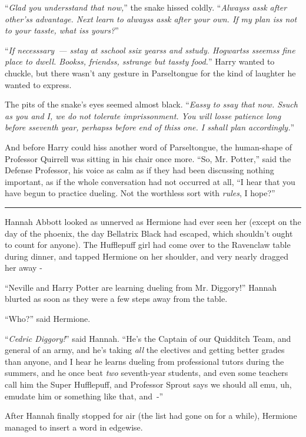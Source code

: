 ``\emph{Glad you undersstand that now,}'' the snake hissed coldly. ``\emph{Alwayss assk after other'ss advantage. Next learn to alwayss assk after your own. If my plan iss not to your tasste, what iss yours?}''

``\emph{If necesssary~--- sstay at sschool ssix yearss and sstudy. Hogwartss sseemss fine place to dwell. Bookss, friendss, sstrange but tassty food.}'' Harry wanted to chuckle, but there wasn't any gesture in Parseltongue for the kind of laughter he wanted to express.

The pits of the snake's eyes seemed almost black. ``\emph{Eassy to ssay that now. Ssuch as you and I, we do not tolerate imprissonment. You will losse patience long before sseventh year, perhapss before end of thiss one. I sshall plan accordingly.}''

And before Harry could hiss another word of Parseltongue, the human-shape of Professor Quirrell was sitting in his chair once more. ``So, Mr. Potter,'' said the Defense Professor, his voice as calm as if they had been discussing nothing important, as if the whole conversation had not occurred at all, ``I hear that you have begun to practice dueling. Not the worthless sort with \emph{rules}, I hope?''

\begin{center}\rule{3in}{0.4pt}\end{center}

Hannah Abbott looked as unnerved as Hermione had ever seen her (except on the day of the phoenix, the day Bellatrix Black had escaped, which shouldn't ought to count for anyone). The Hufflepuff girl had come over to the Ravenclaw table during dinner, and tapped Hermione on her shoulder, and very nearly dragged her away -

``Neville and Harry Potter are learning dueling from Mr. Diggory!'' Hannah blurted as soon as they were a few steps away from the table.

``Who?'' said Hermione.

``\emph{Cedric Diggory!}'' said Hannah. ``He's the Captain of our Quidditch Team, and general of an army, and he's taking \emph{all} the electives and getting better grades than anyone, and I hear he learns dueling from professional tutors during the summers, and he once beat \emph{two} seventh-year students, and even some teachers call him the Super Hufflepuff, and Professor Sprout says we should all emu, uh, emudate him or something like that, and~-''

After Hannah finally stopped for air (the list had gone on for a while), Hermione managed to insert a word in edgewise.

